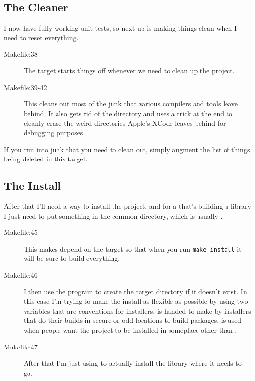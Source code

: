 \subsection{The Cleaner}

I now have fully working unit tests, so next up is making things clean when
I need to reset everything.

\begin{description}
\item[Makefile:38] The  target starts things off whenever we
    need to clean up the project.
\item[Makefile:39-42] This cleans out most of the junk that various compilers
    and tools leave behind.  It also gets rid of the  directory
    and uses a trick at the end to cleanly erase the weird 
    directories Apple's XCode leaves behind for debugging purposes.
\end{description}

If you run into junk that you need to clean out, simply augment the list of things
being deleted in this target.

\subsection{The Install}

After that I'll need a way to install the project, and for a  that's
building a library I just need to put something in the common 
directory, which is usually .

\begin{description}
\item[Makefile:45] This makes  depend on the  target
    so that when you run \verb|make install| it will be sure to build everything.
\item[Makefile:46] I then use the program  to create the target
     directory if it doesn't exist.  In this case I'm trying to make
    the install as flexible as possible by using two variables that are conventions
    for installers.   is handed to make by installers that 
    do their builds in secure or odd locations to build packages.  
    is used when people want the project to be installed in someplace other
    than .
\item[Makefile:47] After that I'm just using  to actually install
    the library where it needs to go.
\end{description}


